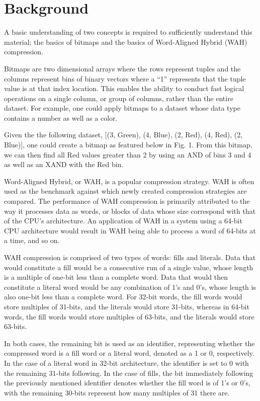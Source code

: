 \documentclass{article}
\begin{document}
\section{Background}
A basic understanding of two concepts is required to sufficiently understand this material; the basics of bitmaps and the basics of Word-Aligned Hybrid (WAH) compression. \par

Bitmaps are two dimensional arrays where the rows represent tuples and the columns represent bins of binary vectors where a “1” represents that the tuple value is at that index location. This enables the ability to conduct fast logical operations on a single column, or group of columns, rather than the entire dataset. For example, one could apply bitmaps to a dataset whose data type contains a number as well as a color. \par

Given the the following dataset, [(3, Green), (4, Blue), (2, Red), (4, Red), (2, Blue)], one could create a bitmap as featured below in Fig. 1. From this bitmap, we can then find all Red values greater than 2 by using an AND of bins 3 and 4 as well as an XAND with the Red bin. \par


Word-Aligned Hybrid, or WAH, is a popular compression strategy. WAH is often used as the benchmark against which newly created compression strategies are compared. The performance of WAH compression is primarily attributed to the way it processes data as words, or blocks of data whose size correspond with that of the CPU's architecture. An application of WAH in a system using a 64-bit CPU architecture would result in WAH being able to process a word of 64-bits at a time, and so on.
\par 
WAH compression is comprised of two types of words: fills and literals. Data that would constitute a fill would be a consecutive run of a single value, whose length is a multiple of one-bit less than a complete word. Data that would then constitute a literal word would be any combination of 1's and 0's, whose length is also one-bit less than a complete word. For 32-bit words, the fill words would store multiples of 31-bits, and the literals would store 31-bits, whereas in 64-bit words, the fill words would store multiples of 63-bits, and the literals would store 63-bits. 
\par 
In both cases, the remaining bit is used as an identifier, representing whether the compressed word is a fill word or a literal word, denoted as a 1 or 0, respectively. In the case of a literal word in 32-bit architecture, the identifier is set to 0 with the remaining 31-bits following. In the case of fills, the bit immediately following the previously mentioned identifier denotes whether the fill word is of 1’s or 0’s, with the remaining 30-bits represent how many multiples of 31 there are. \par
\end{document}
